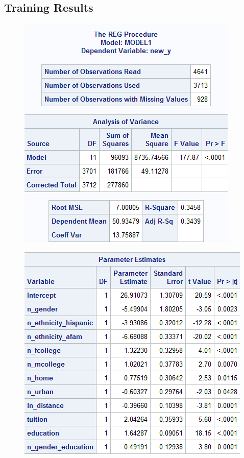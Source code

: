 \documentclass[12pt]{article}
\begin{document}
\subsection{Training Results}
\begin{figure}[h]
    \centering
    \begin{minipage}[t]{0.4\textwidth}
        \vspace{10pt}
        \centering
        \includegraphics[width=\textwidth]{images/training_model1.png}
        \label{fig:unemp_dist}
    \end{minipage}\hfill
    \begin{minipage}[t]{0.55\textwidth}
        \vspace{0pt}
        \centering
        \includegraphics[width=\textwidth]{images/training_model2.png}
        

\end{minipage}
\end{figure}
\end{document}
